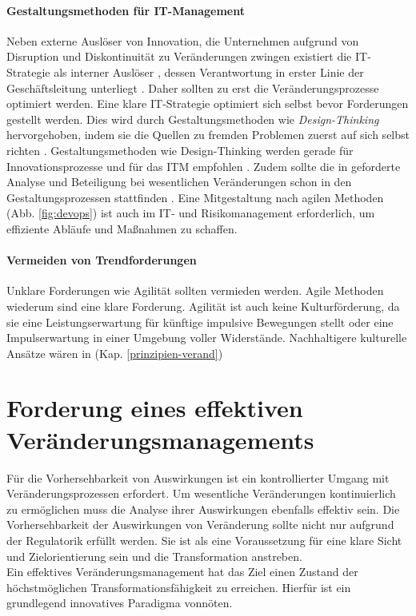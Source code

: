 \paragraph{Gestaltungsmethoden für IT-Management}
Neben externe Auslöser von Innovation, die Unternehmen aufgrund von Disruption und Diskontinuität zu Veränderungen zwingen \cite{Gupta:2017, Fernandez:2020} existiert die IT-Strategie als interner Auslöser \cite{BAIT:2018, Alt2017}, dessen Verantwortung in erster Linie der Geschäftsleitung unterliegt \cite{BAIT:2018}. Daher sollten zu erst die Veränderungsprozesse optimiert werden. Eine klare IT-Strategie optimiert sich selbst bevor Forderungen gestellt werden. Dies wird durch Gestaltungsmethoden wie \emph{Design-Thinking} hervorgehoben, indem sie die Quellen zu fremden Problemen zuerst auf sich selbst richten \cite{yüksel:digit}. Gestaltungsmethoden wie Design-Thinking werden gerade für Innovationsprozesse und für das \ac{ITM} empfohlen \cite{Alt2017, Koch2016}. Zudem sollte die in \citet[AT 8.2]{MaRisk:2017} geforderte Analyse und Beteiligung bei wesentlichen Veränderungen schon in den Gestaltungsprozessen stattfinden \cite{Dorschel2018}. Eine Mitgestaltung nach agilen Methoden (Abb. \ref{fig:devops}) ist auch im IT- und Risikomanagement erforderlich, um effiziente Abläufe und Maßnahmen zu schaffen.

\paragraph{Vermeiden von Trendforderungen}
Unklare Forderungen wie Agilität sollten vermieden werden. Agile Methoden wiederum sind eine klare Forderung. Agilität ist auch keine Kulturförderung, da sie eine Leistungserwartung für künftige impulsive Bewegungen stellt oder eine Impulserwartung in einer Umgebung voller Widerstände. Nachhaltigere kulturelle Ansätze wären in (Kap. \ref{prinzipien-verand})

\section{Forderung eines effektiven Veränderungsmanagements}
Für die Vorhersehbarkeit von Auswirkungen ist ein kontrollierter Umgang mit Veränderungsprozessen erfordert. Um wesentliche Veränderungen kontinuierlich zu ermöglichen muss die Analyse ihrer Auswirkungen \cite{MaRisk:2017} ebenfalls effektiv sein. Die Vorhersehbarkeit der Auswirkungen von Veränderung sollte nicht nur aufgrund der Regulatorik erfüllt werden. Sie ist als eine Voraussetzung für eine klare Sicht und Zielorientierung sein und die Transformation anstreben.
\medskip
\\
Ein effektives Veränderungsmanagement hat das Ziel einen Zustand der höchstmöglichen Transformationsfähigkeit zu erreichen. Hierfür ist ein grundlegend innovatives Paradigma vonnöten. 

